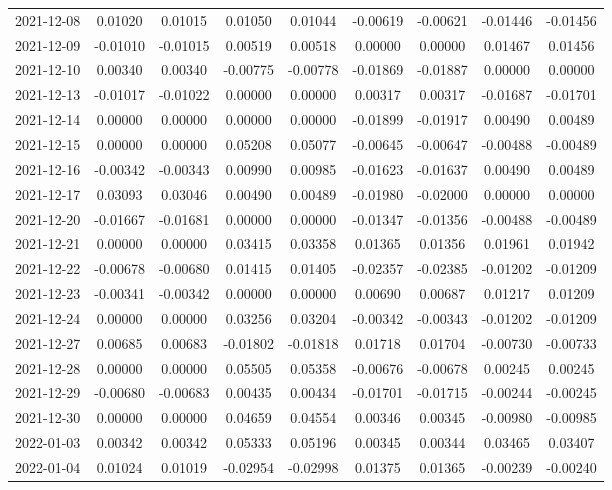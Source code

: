 \begin{footnotesize}
\begin{longtable}{lcccccccc}
2021-12-08 & 0.01020 & 0.01015 & 0.01050 & 0.01044 & -0.00619 & -0.00621 & -0.01446 & -0.01456 \\
2021-12-09 & -0.01010 & -0.01015 & 0.00519 & 0.00518 & 0.00000 & 0.00000 & 0.01467 & 0.01456 \\
2021-12-10 & 0.00340 & 0.00340 & -0.00775 & -0.00778 & -0.01869 & -0.01887 & 0.00000 & 0.00000 \\
2021-12-13 & -0.01017 & -0.01022 & 0.00000 & 0.00000 & 0.00317 & 0.00317 & -0.01687 & -0.01701 \\
2021-12-14 & 0.00000 & 0.00000 & 0.00000 & 0.00000 & -0.01899 & -0.01917 & 0.00490 & 0.00489 \\
2021-12-15 & 0.00000 & 0.00000 & 0.05208 & 0.05077 & -0.00645 & -0.00647 & -0.00488 & -0.00489 \\
2021-12-16 & -0.00342 & -0.00343 & 0.00990 & 0.00985 & -0.01623 & -0.01637 & 0.00490 & 0.00489 \\
2021-12-17 & 0.03093 & 0.03046 & 0.00490 & 0.00489 & -0.01980 & -0.02000 & 0.00000 & 0.00000 \\
2021-12-20 & -0.01667 & -0.01681 & 0.00000 & 0.00000 & -0.01347 & -0.01356 & -0.00488 & -0.00489 \\
2021-12-21 & 0.00000 & 0.00000 & 0.03415 & 0.03358 & 0.01365 & 0.01356 & 0.01961 & 0.01942 \\
2021-12-22 & -0.00678 & -0.00680 & 0.01415 & 0.01405 & -0.02357 & -0.02385 & -0.01202 & -0.01209 \\
2021-12-23 & -0.00341 & -0.00342 & 0.00000 & 0.00000 & 0.00690 & 0.00687 & 0.01217 & 0.01209 \\
2021-12-24 & 0.00000 & 0.00000 & 0.03256 & 0.03204 & -0.00342 & -0.00343 & -0.01202 & -0.01209 \\
2021-12-27 & 0.00685 & 0.00683 & -0.01802 & -0.01818 & 0.01718 & 0.01704 & -0.00730 & -0.00733 \\
2021-12-28 & 0.00000 & 0.00000 & 0.05505 & 0.05358 & -0.00676 & -0.00678 & 0.00245 & 0.00245 \\
2021-12-29 & -0.00680 & -0.00683 & 0.00435 & 0.00434 & -0.01701 & -0.01715 & -0.00244 & -0.00245 \\
2021-12-30 & 0.00000 & 0.00000 & 0.04659 & 0.04554 & 0.00346 & 0.00345 & -0.00980 & -0.00985 \\
2022-01-03 & 0.00342 & 0.00342 & 0.05333 & 0.05196 & 0.00345 & 0.00344 & 0.03465 & 0.03407 \\
2022-01-04 & 0.01024 & 0.01019 & -0.02954 & -0.02998 & 0.01375 & 0.01365 & -0.00239 & -0.00240 \\

\end{longtable}
\end{footnotesize}
